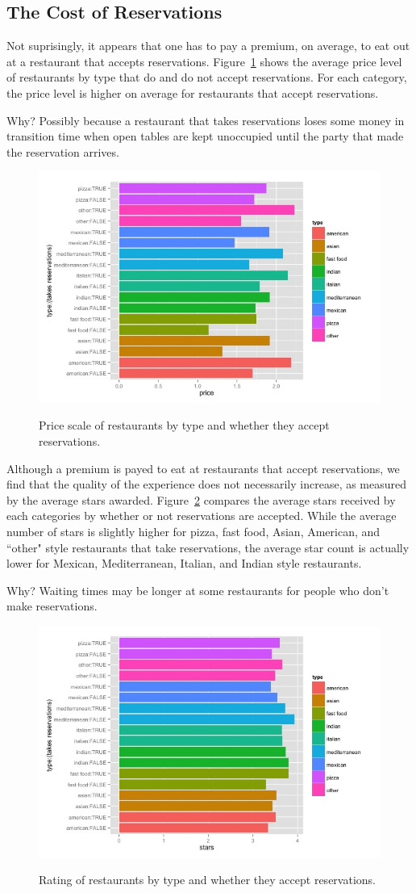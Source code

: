 \documentclass[11pt]{article}
\begin{document}
\subsection{The Cost of Reservations}

Not suprisingly, it appears that one has to pay a premium, on average, to eat out at a restaurant that accepts reservations. Figure~\ref{fig:food_res_price} shows the average price level of restaurants by type that do and do not accept reservations. For each category, the price level is higher on average for restaurants that accept reservations.

Why? Possibly because a restaurant that takes reservations loses some money in transition time when open tables are kept unoccupied until the party that made the reservation arrives.

\begin{figure}[h]
\caption{Price scale of restaurants by type and whether they accept reservations.}
\centering
\includegraphics[width=0.6\linewidth]{Figures/food_res_price.jpeg}
\label{fig:food_res_price}
\end{figure}

Although a premium is payed to eat at restaurants that accept reservations, we find that the quality of the experience does not necessarily increase, as measured by the average stars awarded. Figure~\ref{fig:food_res_stars} compares the average stars received by each categories by whether or not reservations are accepted. While the average number of stars is slightly higher for pizza, fast food, Asian, American, and ``other" style restaurants that take reservations, the average star count is actually lower for Mexican, Mediterranean, Italian, and Indian style restaurants.

Why? Waiting times may be longer at some restaurants for people who don't make reservations.

\begin{figure}[h]
\caption{Rating of restaurants by type and whether they accept reservations.}
\centering
\includegraphics[width=0.6\linewidth]{Figures/food_res_stars.jpeg}
\label{fig:food_res_stars}
\end{figure}
\end{document}
